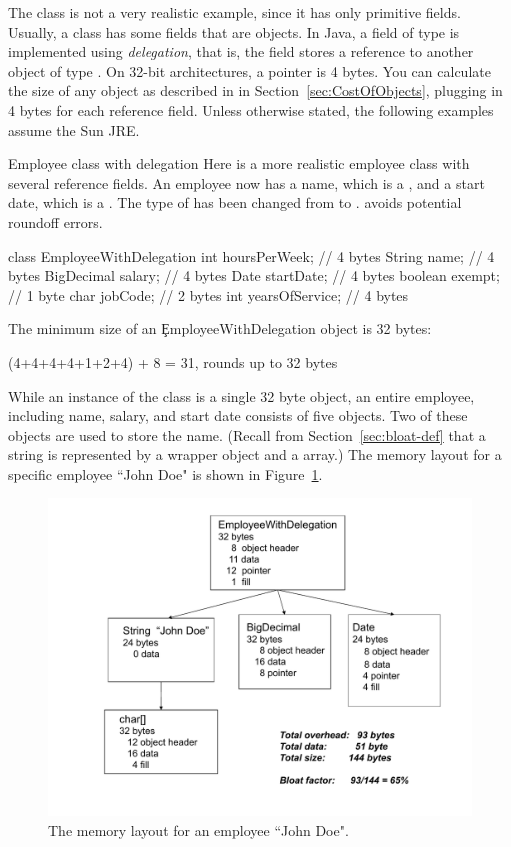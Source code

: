 The  class is not a very realistic example, since it has only
primitive fields. Usually, a class has some fields that are objects.  In Java,
a field of type  is implemented using \textit{delegation},
that is, the field stores a reference to another object of type
. On 32-bit architectures, a pointer is 4 bytes. You can
calculate the size of any object as described in in Section~\ref{sec:CostOfObjects}, plugging in 4 bytes for each reference field. Unless otherwise stated, the following examples assume the Sun JRE.
\begin{example}{Employee class with delegation}
Here is a more realistic employee class with several reference fields. An
employee now has a name, which is a , and a start date, which is a
. The type of  has been changed from 
to .  avoids potential roundoff errors.
\begin{verbatim2} 
class EmployeeWithDelegation {
    int hoursPerWeek;           // 4 bytes
    String name;                // 4 bytes
    BigDecimal salary;          // 4 bytes
    Date startDate;             // 4 bytes
    boolean exempt;             // 1 byte
    char jobCode;               // 2 bytes
    int yearsOfService;         // 4 bytes
}
\end{verbatim2}
The minimum size of an \c{EmployeeWithDelegation} object is 32 bytes:
\begin{verbatim2}
(4+4+4+4+1+2+4) + 8 = 31, rounds up to 32 bytes
\end{verbatim2}
\end{example}

While an instance of the  class is a single 32
byte object, an entire employee, including name, salary, and start date
consists of five objects. Two of these objects are used to store the name.
(Recall from Section~\ref{sec:bloat-def} that a string is represented by a
wrapper  object and a  array.) The memory layout for
a specific employee ``John Doe" is shown in Figure~\ref{fig:employee-status}.
 \begin{figure}
  \centering
 \includegraphics[width=.80\textwidth]{Figures/chapter4/employee-status.pdf}
  \caption{The memory layout for an employee ``John Doe".}
  \label{fig:employee-status}
\end{figure}

